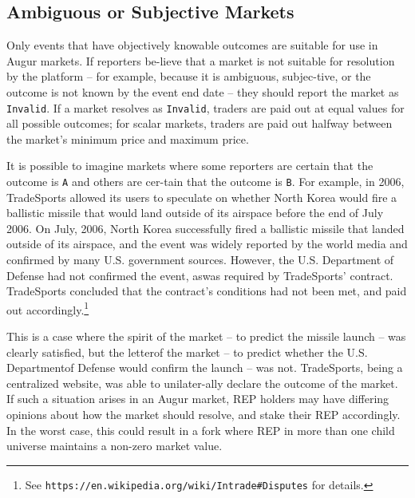 \documentclass[12pt,floatfix,reprint,nofootinbib,amsmath,amssymb,epsfig,pre,floats,letterpaper,groupedaffiliation]{revtex4-1}
\theoremstyle{definition}
\theoremstyle{definition}
\begin{document}
\subsection{Ambiguous or Subjective Markets}\label{section:ambiguous_or_subjective_markets}

Only events that have objectively knowable outcomes are suitable for use in Augur markets. If reporters be-\linebreak lieve that a market is not suitable for resolution by the platform -- for example, because it is ambiguous, subjec-\linebreak tive, or the outcome is not known by the event end date -- they should report the market as \texttt{Invalid}. If a market resolves as \texttt{Invalid}, traders are paid out at equal values for all possible outcomes; for scalar markets, traders are paid out halfway between the market's minimum price and maximum price.

It is possible to imagine markets where some reporters are certain that the outcome is \texttt{A} and others are cer-\linebreak tain that the outcome is \texttt{B}. For example, in 2006, TradeSports allowed its users to speculate on whether North Korea would fire a ballistic missile that would land outside of its airspace before the end of July 2006. On July, 2006, North Korea successfully fired a ballistic missile that landed outside of its airspace, and the event was widely reported by the world media and confirmed by many U.S. government sources. However, the U.S. Department of Defense had not confirmed the event, as\linebreak was required by TradeSports' contract. TradeSports concluded that the contract's conditions had not been met, and paid out accordingly.\footnote{See \texttt{https://en.wikipedia.org/wiki/Intrade\#Disputes} for details.}

This is a case where the spirit of the market -- to predict the missile launch -- was clearly satisfied, but the letter\linebreak of the market -- to predict whether the U.S. Department\linebreak of Defense would confirm the launch -- was not. TradeSports, being a centralized website, was able to unilater-\linebreak ally declare the outcome of the market. If such a situation arises in an Augur market, REP holders may have differing opinions about how the market should resolve, and stake their REP accordingly. In the worst case, this could result in a fork where REP in more than one child universe maintains a non-zero market value.
\end{document}
